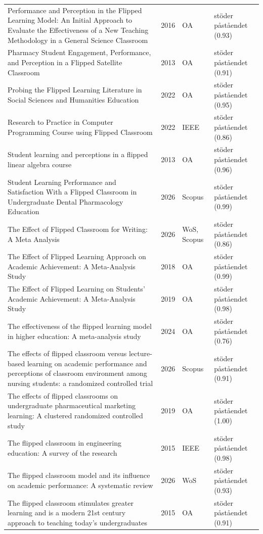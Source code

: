 \begin{longtable}{@{}%
  >{\raggedright\arraybackslash}p{}c%
  >{\raggedright\arraybackslash}p{}%
  >{\raggedright\arraybackslash}p{}@{}}
Performance and Perception in the Flipped Learning Model: An Initial Approach to Evaluate the Effectiveness of a New Teaching Methodology in a General Science Classroom & 2016 & OA & stöder påståendet (0.93) \\
Pharmacy Student Engagement, Performance, and Perception in a Flipped Satellite Classroom & 2013 & OA & stöder påståendet (0.91) \\
Probing the Flipped Learning Literature in Social Sciences and Humanities Education & 2022 & OA & stöder påståendet (0.95) \\
Research to Practice in Computer Programming Course using Flipped Classroom & 2022 & IEEE & stöder påståendet (0.86) \\
Student learning and perceptions in a flipped linear algebra course & 2013 & OA & stöder påståendet (0.96) \\
Student Learning Performance and Satisfaction With a Flipped Classroom in Undergraduate Dental Pharmacology Education & 2026 & Scopus & stöder påståendet (0.99) \\
The Effect of Flipped Classroom for Writing: A Meta Analysis & 2026 & WoS, Scopus & stöder påståendet (0.86) \\
The Effect of Flipped Learning Approach on Academic Achievement: A Meta-Analysis Study & 2018 & OA & stöder påståendet (0.99) \\
The Effect of Flipped Learning on Students' Academic Achievement: A Meta-Analysis Study & 2019 & OA & stöder påståendet (0.98) \\
The effectiveness of the flipped learning model in higher education: A meta-analysis study & 2024 & OA & stöder påståendet (0.76) \\
The effects of flipped classroom versus lecture-based learning on academic performance and perceptions of classroom environment among nursing students: a randomized controlled trial & 2026 & Scopus & stöder påståendet (0.91) \\
The effects of flipped classrooms on undergraduate pharmaceutical marketing learning: A clustered randomized controlled study & 2019 & OA & stöder påståendet (1.00) \\
The flipped classroom in engineering education: A survey of the research & 2015 & IEEE & stöder påståendet (0.98) \\
The flipped classroom model and its influence on academic performance: A systematic review & 2026 & WoS & stöder påståendet (0.93) \\
The flipped classroom stimulates greater learning and is a modern 21st century approach to teaching today's undergraduates & 2015 & OA & stöder påståendet (0.91) \\

\end{longtable}

